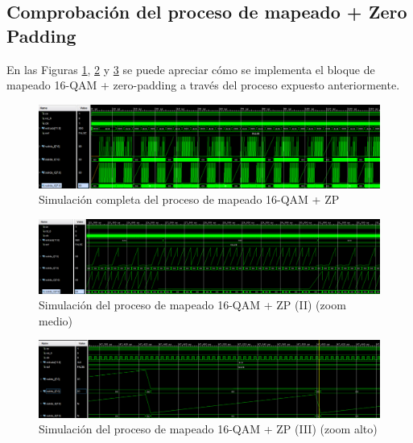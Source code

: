 \subsection{Comprobación del proceso de mapeado + Zero Padding}

En las Figuras \ref{fig:proc2}, \ref{fig:proc3} y \ref{fig:proc1} se puede apreciar cómo se implementa el bloque de mapeado 16-QAM + zero-padding a través del proceso expuesto anteriormente.

\vspace{3mm}

\begin{figure}[h]
	\centering
	\includegraphics[width=1\textwidth]{img/simu/process_qam_2.PNG}
	\caption{Simulación completa del proceso de mapeado 16-QAM + ZP}
	\label{fig:proc2}
\end{figure}

\vspace{3mm}

\begin{figure}[h]
	\centering
	\includegraphics[width=1\textwidth]{img/simu/process_qam_3.PNG}
	\caption{Simulación del proceso de mapeado 16-QAM + ZP (II) (zoom medio)}
	\label{fig:proc3}
\end{figure}

\vspace{3mm}

\begin{figure}[h]
	\centering
	\includegraphics[width=1\textwidth]{img/simu/process_qam.PNG}
	\caption{Simulación del proceso de mapeado 16-QAM + ZP (III) (zoom alto)}
	\label{fig:proc1}
\end{figure}

